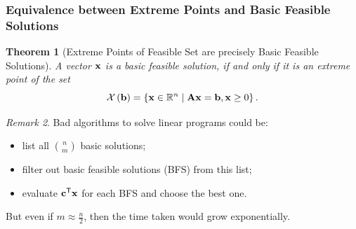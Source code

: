 \documentclass[11pt]{article}
\newtheorem{theorem}{Theorem}[section]
\theoremstyle{definition}
\theoremstyle{remark}
\newtheorem{remark}[theorem]{Remark}
\newcommand{\pqty}[1]{\left(#1\right)}
\newcommand{\flatfrac}[2]{\frac{#1}{#2}}
\newcommand{\set}[2]{\left\{#1\mid #2\right\}}
\newcommand{\RR}{\mathbb{R}}
\newcommand{\transpose}{^{\mathsf{T}}}
\begin{document}
\subsubsection{Equivalence between Extreme Points and Basic Feasible Solutions}

\begin{theorem}[Extreme Points of Feasible Set are precisely Basic Feasible Solutions]\label{optim-unit-0050}
    A vector \(\vb{x}\) is a basic feasible solution, if and only if it is an extreme point of the set
    \[
        \mathcal{X} \pqty{\vb{b}} = \set{\vb{x} \in \RR^n}{\vb{Ax} = \vb{b}, \vb{x} \geq 0}.
    \]
\end{theorem}

\begin{remark}\label{optim-unit-0051}
    Bad algorithms to solve linear programs could be:
    \begin{itemize}
        \item list all \(\binom{n}{m}\) basic solutions;
        \item filter out basic feasible solutions (BFS) from this list;
        \item evaluate \(\vb{c}\transpose \vb{x}\) for each BFS and choose the best one.
    \end{itemize}

    But even if \(m \approx \flatfrac{n}{2}\), then the time taken would grow exponentially.
\end{remark}
\end{document}
